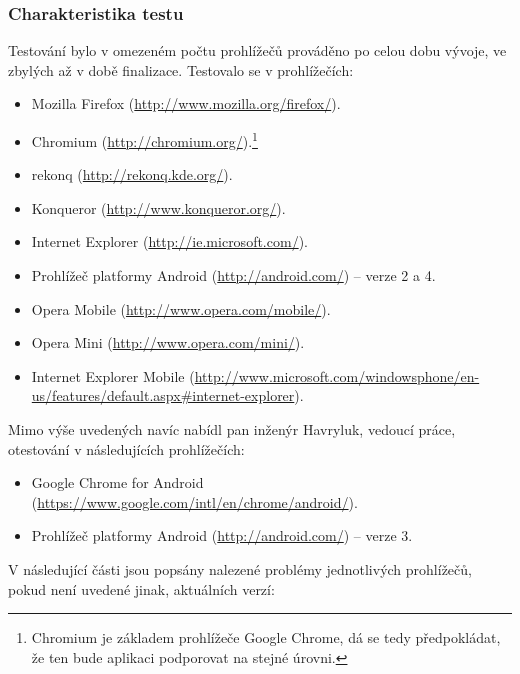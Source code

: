 \subsubsection{Charakteristika testu}
Testování bylo v omezeném počtu prohlížečů prováděno po celou dobu vývoje, ve zbylých až v době finalizace. Testovalo se v prohlížečích:
\begin{itemize}
 \item Mozilla Firefox (\url{http://www.mozilla.org/firefox/}).
 \item Chromium (\url{http://chromium.org/}).\footnote{Chromium je základem prohlížeče Google Chrome, dá se tedy předpokládat, že ten bude aplikaci podporovat na stejné úrovni.}
 \item rekonq (\url{http://rekonq.kde.org/}).
 \item Konqueror (\url{http://www.konqueror.org/}).
 \item Internet Explorer (\url{http://ie.microsoft.com/}).
 \item Prohlížeč platformy Android (\url{http://android.com/}) -- verze 2 a 4.
 \item Opera Mobile (\url{http://www.opera.com/mobile/}).
 \item Opera Mini (\url{http://www.opera.com/mini/}).
 \item Internet Explorer Mobile (\url{http://www.microsoft.com/windowsphone/en-us/features/default.aspx#internet-explorer}).
\end{itemize}
Mimo výše uvedených navíc nabídl pan inženýr Havryluk, vedoucí práce, otestování v následujících prohlížečích:
\begin{itemize}
 \item Google Chrome for Android (\url{https://www.google.com/intl/en/chrome/android/}).
 \item Prohlížeč platformy Android (\url{http://android.com/}) -- verze 3.
\end{itemize}

V následující části jsou popsány nalezené problémy jednotlivých prohlížečů, pokud není uvedené jinak, aktuálních verzí:


